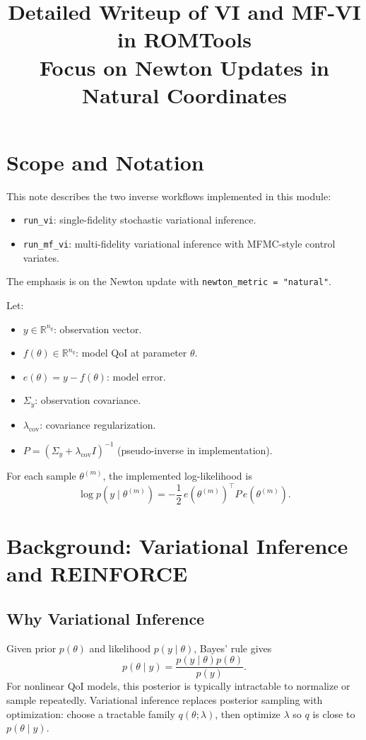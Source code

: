\documentclass[11pt]{article}
\title{Detailed Writeup of VI and MF-VI in ROMTools\\
\large Focus on Newton Updates in Natural Coordinates}
\author{}
\date{}
\begin{document}
\maketitle

\section{Scope and Notation}
This note describes the two inverse workflows implemented in this module:
\begin{itemize}
  \item \texttt{run\_vi}: single-fidelity stochastic variational inference.
  \item \texttt{run\_mf\_vi}: multi-fidelity variational inference with MFMC-style control variates.
\end{itemize}
The emphasis is on the Newton update with \texttt{newton\_metric = "natural"}.

Let:
\begin{itemize}
  \item \(y \in \mathbb{R}^{n_q}\): observation vector.
  \item \(f(\theta)\in\mathbb{R}^{n_q}\): model QoI at parameter \(\theta\).
  \item \(e(\theta)=y-f(\theta)\): model error.
  \item \(\Sigma_y\): observation covariance.
  \item \(\lambda_{\mathrm{cov}}\): covariance regularization.
  \item \(P = (\Sigma_y + \lambda_{\mathrm{cov}} I)^{-1}\) (pseudo-inverse in implementation).
\end{itemize}

For each sample \(\theta^{(m)}\), the implemented log-likelihood is
\begin{equation}
\log p(y\mid \theta^{(m)}) = -\frac12\, e(\theta^{(m)})^\top P\, e(\theta^{(m)}).
\end{equation}

\section{Background: Variational Inference and REINFORCE}
\subsection{Why Variational Inference}
Given prior \(p(\theta)\) and likelihood \(p(y\mid\theta)\), Bayes' rule gives
\begin{equation}
p(\theta\mid y)=\frac{p(y\mid\theta)p(\theta)}{p(y)}.
\end{equation}
For nonlinear QoI models, this posterior is typically intractable to normalize or sample repeatedly.
Variational inference replaces posterior sampling with optimization:
choose a tractable family \(q(\theta;\lambda)\), then optimize \(\lambda\) so
\(q\) is close to \(p(\theta\mid y)\).
\end{document}

